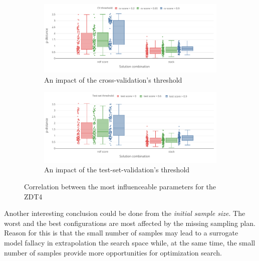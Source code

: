         \begin{figure}
            \centering
            \begin{subfigure}{\textwidth}
                \includegraphics[width=\textwidth]{content/images/conf_zdt4_cv_score}
                \caption{An impact of the cross-validation's threshold}
                \label{fig:zdt4_pred_solver}
            \end{subfigure} 
            \begin{subfigure}{\textwidth}
                \includegraphics[width=\textwidth]{content/images/conf_zdt4_test_score}
                \caption{An impact of the test-set-validation's threshold}
                \label{fig:zdt4_comb_valid}
            \end{subfigure}
            \caption[Correlation between the most influenceable parameters for the ZDT4]{Correlation between the most influenceable parameters for the ZDT4} 
            \label{fig:conf_zdt4_sign}    
        \end{figure}

    Another interesting conclusion could be done from the \emph{initial sample size}. The worst and the best configurations are most affected by the missing sampling plan. Reason for this is that the small number of samples may lead to a surrogate model fallacy in extrapolation the search space while, at the same time, the small number of samples provide more opportunities for optimization search.

